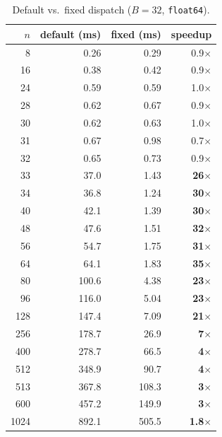 \documentclass[10pt, letterpaper]{article}
\begin{document}
\begin{table}[h]
\centering
\caption{Default vs.\ fixed dispatch ($B = 32$, \texttt{float64}).}
\label{tab:f64_B32}
\begin{tabular}{r rrr}
\toprule
$n$ & default (ms) & fixed (ms) & speedup \\
\midrule
     8  &    0.26 &    0.29 & 0.9$\times$ \\
    16  &    0.38 &    0.42 & 0.9$\times$ \\
    24  &    0.59 &    0.59 & 1.0$\times$ \\
    28  &    0.62 &    0.67 & 0.9$\times$ \\
    30  &    0.62 &    0.63 & 1.0$\times$ \\
    31  &    0.67 &    0.98 & 0.7$\times$ \\
    32  &    0.65 &    0.73 & 0.9$\times$ \\
\midrule
    33  &    37.0 &    1.43 & \textbf{26$\times$} \\
    34  &    36.8 &    1.24 & \textbf{30$\times$} \\
    40  &    42.1 &    1.39 & \textbf{30$\times$} \\
    48  &    47.6 &    1.51 & \textbf{32$\times$} \\
    56  &    54.7 &    1.75 & \textbf{31$\times$} \\
    64  &    64.1 &    1.83 & \textbf{35$\times$} \\
    80  &   100.6 &    4.38 & \textbf{23$\times$} \\
    96  &   116.0 &    5.04 & \textbf{23$\times$} \\
   128  &   147.4 &    7.09 & \textbf{21$\times$} \\
   256  &   178.7 &    26.9 & \textbf{7$\times$} \\
   400  &   278.7 &    66.5 & \textbf{4$\times$} \\
   512  &   348.9 &    90.7 & \textbf{4$\times$} \\
   513  &   367.8 &   108.3 & \textbf{3$\times$} \\
   600  &   457.2 &   149.9 & \textbf{3$\times$} \\
  1024  &   892.1 &   505.5 & \textbf{1.8$\times$} \\
\bottomrule
\end{tabular}
\end{table}
\end{document}
